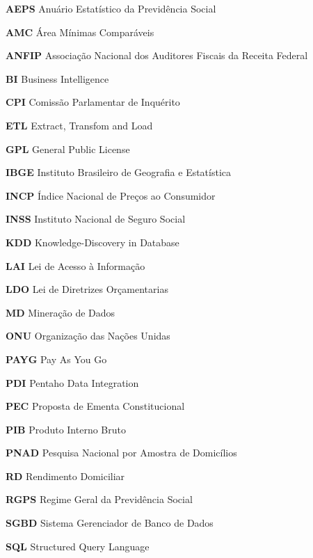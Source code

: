 \documentclass[
	12pt,					%
	openright,				%
	oneside,					%
	a4paper,					%
	english,					%
	brazil					%
	]{abntex2}
\begin{document}
\begin{siglas}
    \item[\textbf{AEPS}] Anuário Estatístico da Previdência Social
    \item[\textbf{AMC}] Área Mínimas Comparáveis
    \item[\textbf{ANFIP}] Associação Nacional dos Auditores Fiscais da Receita Federal
    \item[\textbf{BI}] Business Intelligence
    \item[\textbf{CPI}] Comissão Parlamentar de Inquérito
    \item[\textbf{ETL}] Extract, Transfom and Load
    \item[\textbf{GPL}] General Public License
    \item[\textbf{IBGE}] Instituto Brasileiro de Geografia e Estatística
    \item[\textbf{INCP}] Índice Nacional de Preços ao Consumidor
    \item[\textbf{INSS}] Instituto Nacional de Seguro Social
    \item[\textbf{KDD}] Knowledge-Discovery in Database
    \item[\textbf{LAI}] Lei de Acesso à Informação
    \item[\textbf{LDO}] Lei de Diretrizes Orçamentarias
    \item[\textbf{MD}] Mineração de Dados
    \item[\textbf{ONU}] Organização das Nações Unidas
    \item[\textbf{PAYG}] Pay As You Go
    \item[\textbf{PDI}] Pentaho Data Integration
    \item[\textbf{PEC}] Proposta de Ementa Constitucional
    \item[\textbf{PIB}] Produto Interno Bruto
    \item[\textbf{PNAD}] Pesquisa Nacional por Amostra de Domicílios
    \item[\textbf{RD}] Rendimento Domiciliar
    \item[\textbf{RGPS}] Regime Geral da Previdência Social
    \item[\textbf{SGBD}] Sistema Gerenciador de Banco de Dados
    \item[\textbf{SQL}] Structured Query Language
\end{siglas}

\end{document}
